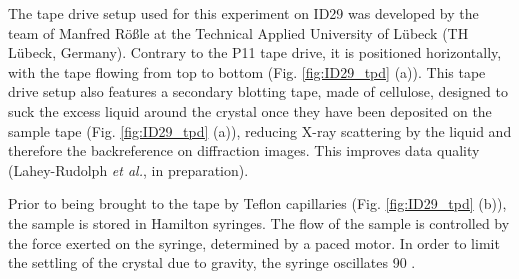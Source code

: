 The tape drive setup used for this experiment on ID29 was developed by the team of Manfred Rößle at the Technical Applied University of Lübeck (TH Lübeck, Germany). Contrary to the P11 tape drive, it is positioned horizontally, with the tape flowing from top to bottom (Fig. \ref{fig:ID29_tpd} (a)). This tape drive setup also features a secondary blotting tape, made of cellulose, designed to suck the excess liquid around the crystal once they have been deposited on the sample tape (Fig. \ref{fig:ID29_tpd} (a)), reducing X-ray scattering by the liquid and therefore the backreference on diffraction images. This improves data quality (Lahey-Rudolph \textit{et al.}, in preparation). 

Prior to being brought to the tape by Teflon capillaries (Fig. \ref{fig:ID29_tpd} (b)), the sample is stored in Hamilton syringes. The flow of the sample is controlled by the force exerted on the syringe, determined by a paced motor. In order to limit the settling of the crystal due to gravity, the syringe oscillates 90 \degree. 

